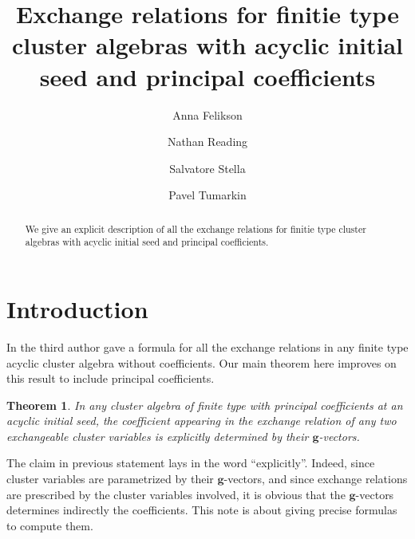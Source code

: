 \documentclass[11pt]{amsart}
\newcommand{\bg}{\mathbf{g}}
\newtheorem{theorem}{Theorem}[section]
\numberwithin{equation}{section}
\begin{document}
\title[Exchange relations for finite type]{Exchange relations for finitie type cluster algebras with acyclic initial seed and principal coefficients}

\author[Felikson]{Anna Felikson}
\address[Anna Felikson]{Durham University}

\author[Reading]{Nathan Reading}
\address[Nathan Reading]{North Carolina State Univesity}

\author[Stella]{Salvatore Stella}
\address[Salvatore Stella]{IN$d$AM - Marie Curie Actions fellow, Universit\`a\`{ }La Sapienza'', Roma, Italy.}

\author[tumarkin]{Pavel Tumarkin}
\address[Pavel Tumarkin]{Durham University}

\begin{abstract}
We give an explicit description of all the exchange relations for finitie type cluster algebras with acyclic initial seed and principal coefficients.
\end{abstract}

\maketitle

\section{Introduction}
  In \cite{Ste13} the third author gave a formula for all the exchange relations in any finite type acyclic cluster algebra without coefficients.
  Our main theorem here improves on this result to include principal coefficients.
  
  \begin{theorem}
    \label{thm:main_vague}
    In any cluster algebra of finite type with principal coefficients at an acyclic initial seed, the coefficient appearing in the exchange relation of any two exchangeable cluster variables is \emph{explicitly} determined by their $\bg$-vectors. 
  \end{theorem}
  
  The claim in previous statement lays in the word ``explicitly''. 
  Indeed, since cluster variables are parametrized by their $\bg$-vectors, and since exchange relations are prescribed by the cluster variables involved, it is obvious that the $\bg$-vectors determines indirectly the coefficients. 
  This note is about giving precise formulas to compute them.
 
\end{document}
